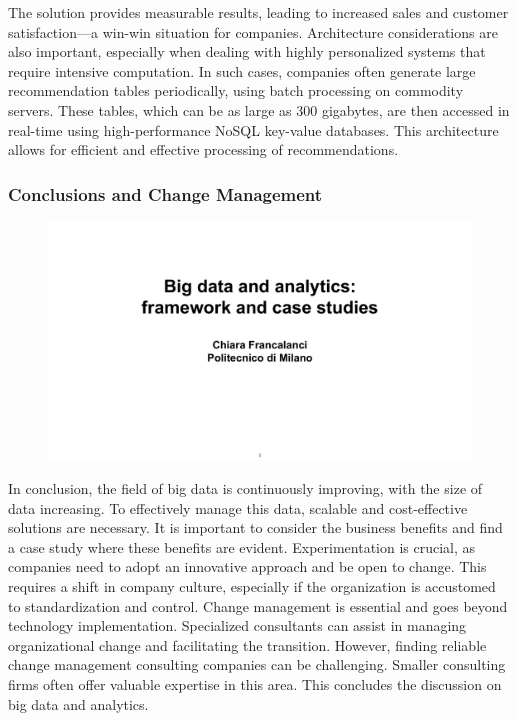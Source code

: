 The solution provides measurable results, leading to increased sales and
customer satisfaction---a win-win situation for companies. Architecture
considerations are also important, especially when dealing with highly
personalized systems that require intensive computation. In such cases,
companies often generate large recommendation tables periodically, using
batch processing on commodity servers. These tables, which can be as
large as 300 gigabytes, are then accessed in real-time using
high-performance NoSQL key-value databases. This architecture allows for
efficient and effective processing of recommendations.

\subsubsection{Conclusions and Change Management}

\begin{figure}[!h]
  \centering
  \includegraphics[page=99, trim = 0cm 7cm 1.5cm 4.5cm, clip, width=\imagewidth]{images/06 - BIG_DATA.pdf}
\end{figure}

In conclusion, the field of big data is continuously improving, with the
size of data increasing. To effectively manage this data, scalable and
cost-effective solutions are necessary. It is important to consider the
business benefits and find a case study where these benefits are
evident. Experimentation is crucial, as companies need to adopt an
innovative approach and be open to change. This requires a shift in
company culture, especially if the organization is accustomed to
standardization and control. Change management is essential and goes
beyond technology implementation. Specialized consultants can assist in
managing organizational change and facilitating the transition. However,
finding reliable change management consulting companies can be
challenging. Smaller consulting firms often offer valuable expertise in
this area. This concludes the discussion on big data and analytics.

